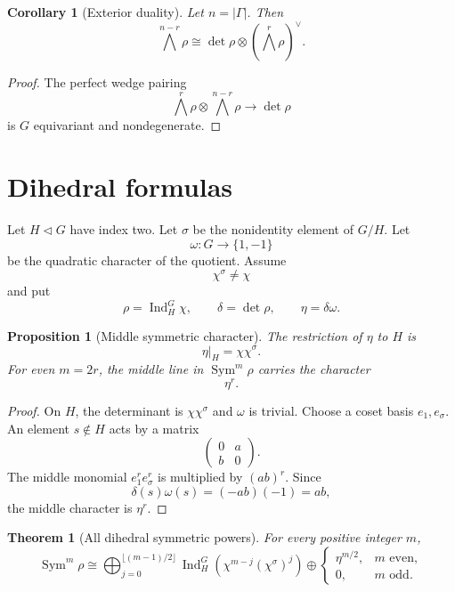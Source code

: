\documentclass{aomart}
\newtheorem{theorem}{Theorem}[section]
\newtheorem{proposition}[proposition]{Proposition}
\newtheorem{corollary}[corollary]{Corollary}
\theoremstyle{definition}
\theoremstyle{remark}
\newcommand{\Ind}{\operatorname{Ind}}
\newcommand{\Sym}{\operatorname{Sym}}
\newcommand{\abs}[1]{\left\lvert#1\right\rvert}
\begin{document}
\begin{corollary}[Exterior duality]\label{cor:exterior_duality}
Let \(n=\abs\Gamma\). Then
\[
\boxed{
\bigwedge^{n-r}\rho
\cong
\det\rho\otimes
\left(\bigwedge^r\rho\right)^\vee.
}
\]
\end{corollary}

\begin{proof}
The perfect wedge pairing
\[
\bigwedge^r\rho
\otimes
\bigwedge^{n-r}\rho
\longrightarrow
\det\rho
\]
is \(G\) equivariant and nondegenerate.
\end{proof}

\section{Dihedral formulas}\label{sec:dihedral}

Let \(H\triangleleft G\) have index two. Let \(\sigma\) be the nonidentity element of \(G/H\). Let
\[
\omega:G\longrightarrow\{1,-1\}
\]
be the quadratic character of the quotient. Assume
\[
\chi^\sigma\neq\chi
\]
and put
\[
\rho=\Ind_H^G\chi,
\qquad
\delta=\det\rho,
\qquad
\eta=\delta\omega.
\]

\begin{proposition}[Middle symmetric character]\label{prop:middle_character}
The restriction of \(\eta\) to \(H\) is
\[
\eta|_H=\chi\chi^\sigma.
\]
For even \(m=2r\), the middle line in \(\Sym^m\rho\) carries the character
\[
\boxed{
\eta^r.
}
\]
\end{proposition}

\begin{proof}
On \(H\), the determinant is \(\chi\chi^\sigma\) and \(\omega\) is trivial. Choose a coset basis \(e_1,e_\sigma\). An element \(s\notin H\) acts by a matrix
\[
\begin{pmatrix}
0&a\\
b&0
\end{pmatrix}.
\]
The middle monomial \(e_1^re_\sigma^r\) is multiplied by \((ab)^r\). Since
\[
\delta(s)\omega(s)=(-ab)(-1)=ab,
\]
the middle character is \(\eta^r\).
\end{proof}

\begin{theorem}[All dihedral symmetric powers]\label{thm:dihedral_symmetric}
For every positive integer \(m\),
\[
\boxed{
\Sym^m\rho
\cong
\bigoplus_{j=0}^{\lfloor(m-1)/2\rfloor}
\Ind_H^G
\left(
\chi^{m-j}(\chi^\sigma)^j
\right)
\mathbin{\oplus}
\begin{cases}
\eta^{m/2},&m\text{ even},\\
0,&m\text{ odd}.
\end{cases}
}
\]
\end{theorem}
\end{document}
